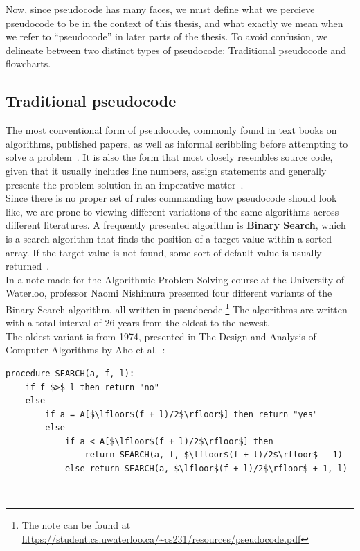 Now, since pseudocode has many faces, we must define what we percieve pseudocode to be in the context of this thesis, and what exactly we mean when we refer to ``pseudocode'' in later parts of the thesis. To avoid confusion, we delineate between two distinct types of pseudocode: Traditional pseudocode and flowcharts.

\subsection{Traditional pseudocode}

The most conventional form of pseudocode, commonly found in text books on algorithms, published papers, as well as informal scribbling before attempting to solve a problem~\cite{payAttentionToMLPs, BOOK:intro/Cormen/Leiserson}. It is also the form that most closely resembles source code, given that it usually includes line numbers, assign statements and generally presents the problem solution in an imperative matter~\cite{proposalForParadigmGeneralPseudocode}. \hfill \\

Since there is no proper set of rules commanding how pseudocode should look like, we are prone to viewing different variations of the same algorithms across different literatures. A frequently presented algorithm is \textbf{Binary Search}, which is a search algorithm that finds the position of a target value within a sorted array. If the target value is not found, some sort of default value is usually returned~\cite{BOOK:intro/Cormen/Leiserson}. \hfill \\

In a note made for the Algorithmic Problem Solving course at the University of Waterloo, professor Naomi Nishimura presented four different variants of the Binary Search algorithm, all written in pseudocode.\footnote{The note can be found at \url{https://student.cs.uwaterloo.ca/~cs231/resources/pseudocode.pdf}} The algorithms are written with a total interval of 26 years from the oldest to the newest. \hfill \\

The oldest variant is from 1974, presented in The Design and Analysis of Computer Algorithms by Aho et al.~\cite[139]{BOOK:DesignAnalysis/Aho}: \hfill \\

\begin{lstlisting}[frame=tlrb]
    procedure SEARCH(a, f, l):
    if f $>$ l then return "no"
    else
        if a = A[$\lfloor$(f + l)/2$\rfloor$] then return "yes"
        else
            if a < A[$\lfloor$(f + l)/2$\rfloor$] then
                return SEARCH(a, f, $\lfloor$(f + l)/2$\rfloor$ - 1)
            else return SEARCH(a, $\lfloor$(f + l)/2$\rfloor$ + 1, l)
\end{lstlisting} \hfill \\

